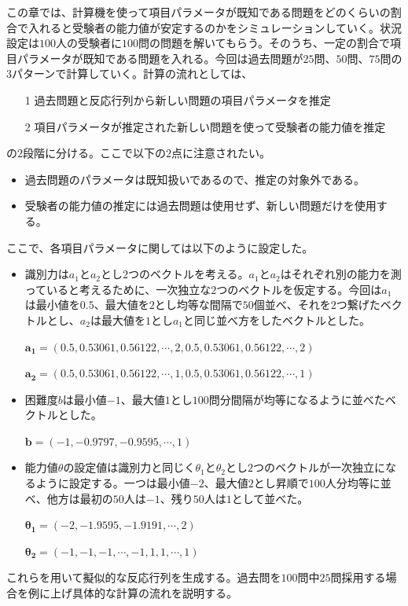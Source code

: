 \documentclass[12pt]{jarticle}
\numberwithin{equation}{subsection}
\begin{document}
この章では、計算機を使って項目パラメータが既知である問題をどのくらいの割合で入れると受験者の能力値が安定するのかをシミュレーションしていく。状況設定は$100$人の受験者に$100$問の問題を解いてもらう。そのうち、一定の割合で項目パラメータが既知である問題を入れる。今回は過去問題が$25$問、$50$問、$75$問の$3$パターンで計算していく。計算の流れとしては、
\begin{itemize}
  \item[1] 過去問題と反応行列から新しい問題の項目パラメータを推定
  \item[2] 項目パラメータが推定された新しい問題を使って受験者の能力値を推定
\end{itemize}
の$2$段階に分ける。ここで以下の$2$点に注意されたい。
\begin{itemize}
  \item 過去問題のパラメータは既知扱いであるので、推定の対象外である。
  \item 受験者の能力値の推定には過去問題は使用せず、新しい問題だけを使用する。
\end{itemize}ここで、各項目パラメータに関しては以下のように設定した。
\begin{itemize}
  \item 識別力は$a_1$と$a_2$とし$2$つのベクトルを考える。$a_1$と$a_2$はそれぞれ別の能力を測っていると考えるために、一次独立な$2$つのベクトルを仮定する。今回は$a_1$は最小値を$0.5$、最大値を$2$とし均等な間隔で$50$個並べ、それを$2$つ繋げたベクトルとし、$a_2$は最大値を$1$とし$a_1$と同じ並べ方をしたベクトルとした。

  $\boldsymbol{a_1} = (0.5, 0.53061, 0.56122, \cdots, 2, 0.5, 0.53061, 0.56122, \cdots, 2)$

  $\boldsymbol{a_2} = (0.5, 0.53061, 0.56122, \cdots, 1, 0.5, 0.53061, 0.56122, \cdots, 1)$
  \item 困難度$b$は最小値$-1$、最大値$1$とし$100$問分間隔が均等になるように並べたベクトルとした。

  $\boldsymbol{b} = (-1, -0.9797, -0.9595, \cdots, 1)$
  \item 能力値$\theta$の設定値は識別力と同じく$\theta_1$と$\theta_2$とし$2$つのベクトルが一次独立になるように設定する。一つは最小値$-2$、最大値$2$とし昇順で$100$人分均等に並べ、他方は最初の$50$人は$-1$、残り$50$人は$1$として並べた。

  $\boldsymbol{\theta_1} = (-2, -1.9595, -1.9191, \cdots, 2)$

  $\boldsymbol{\theta_2} = (-1, -1, -1, \cdots, -1, 1, 1, \cdots, 1)$
\end{itemize}
これらを用いて擬似的な反応行列を生成する。過去問を$100$問中$25$問採用する場合を例に上げ具体的な計算の流れを説明する。
\end{document}
